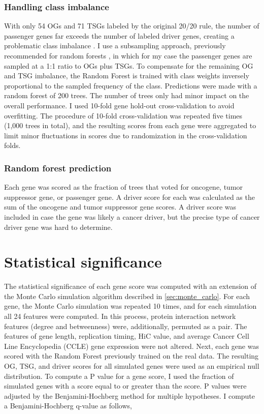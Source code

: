 \subsubsection{Handling class imbalance}

With only 54 OGs and 71 TSGs labeled by the original 20/20 rule, the number of passenger genes far exceeds the number of labeled driver genes, creating a problematic class imbalance \cite{RN93}. I use a subsampling approach, previously recommended for random forests \cite{RN92}, in which for my case the passenger genes are sampled at a 1:1 ratio to OGs plus TSGs. To compensate for the remaining OG and TSG imbalance, the Random Forest is trained with class weights inversely proportional to the sampled frequency of the class. Predictions were made with a random forest of 200 trees. The number of trees only had minor impact on the overall performance. I used 10-fold gene hold-out cross-validation to avoid overfitting. The procedure of 10-fold cross-validation was repeated five times (1,000 trees in total), and the resulting scores from each gene were aggregated to limit minor fluctuations in scores due to randomization in the cross-validation folds.

\subsubsection{Random forest prediction}

Each gene was scored as the fraction of trees that voted for oncogene, tumor suppressor gene, or passenger gene. A driver score for each was calculated as the sum of the oncogene and tumor suppressor gene scores. A driver score was included in case the gene was likely a cancer driver, but the precise type of cancer driver gene was hard to determine.

\section{Statistical significance}

The statistical significance of each gene score was computed with an extension of the Monte Carlo simulation algorithm described in \autoref{sec:monte_carlo}. For each gene, the Monte Carlo simulation was repeated 10 times, and for each simulation all 24 features were computed. In this process, protein interaction network features (degree and betweenness) were, additionally, permuted as a pair. The features of gene length, replication timing, HiC value, and average Cancer Cell Line Encyclopedia (CCLE) gene expression were not altered. Next, each  gene was scored with the Random Forest previously trained on the real data. The resulting OG, TSG, and driver scores for all simulated genes were used as an empirical null distribution. To compute a P value for a gene score, I used the fraction of simulated genes with a score equal to or greater than the score. P values were adjusted by the Benjamini-Hochberg method \cite{RN94} for multiple hypotheses. I compute a Benjamini-Hochberg q-value as follows,

